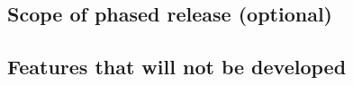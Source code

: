 \documentclass[11pt]{article}
\begin{document}


\subsection{Scope of phased release (optional)}




\subsection{Features that will not be developed}


\end{document}
